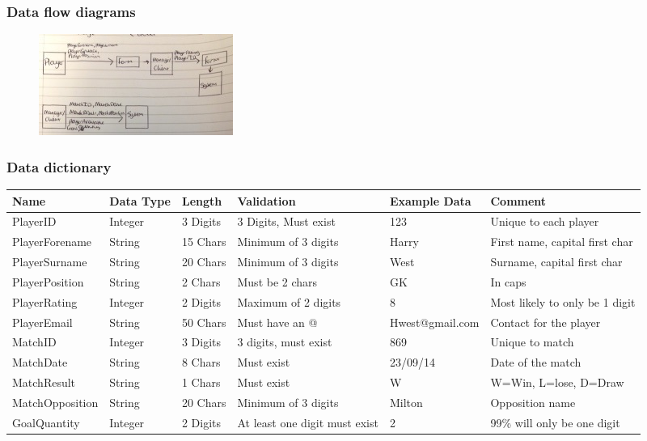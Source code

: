 \subsubsection{Data flow diagrams}
\begin{figure}[H]
	\includegraphics{dataflow}
\end{figure}

\subsubsection{Data dictionary}

\begin{table}[H]
\centering
\label{my-label}
\begin{tabular}{|p{2.5cm}|p{1cm}|p{1.5cm}|p{2.5cm}|p{2.5cm}|p{2.5cm}|} 
\hline
Name            & Data Type & Length   & Validation                    & Example Data    & Comment                        \\ \hline
PlayerID        & Integer   & 3 Digits & 3 Digits, Must exist          & 123             & Unique to each player          \\ \hline
PlayerForename  & String    & 15 Chars & Minimum of 3 digits           & Harry           & First name, capital first char \\ \hline
PlayerSurname   & String    & 20 Chars & Minimum of 3 digits           & West            & Surname, capital first char    \\ \hline
PlayerPosition  & String    & 2 Chars  & Must be 2 chars               & GK              & In caps                        \\ \hline
PlayerRating    & Integer   & 2 Digits & Maximum of 2 digits           & 8               & Most likely to only be 1 digit \\ \hline
PlayerEmail     & String    & 50 Chars & Must have an @                & Hwest@gmail.com & Contact for the player         \\ \hline
MatchID         & Integer   & 3 Digits & 3 digits, must exist          & 869             & Unique to match                \\ \hline
MatchDate       & String    & 8 Chars  & Must exist                    & 23/09/14        & Date of the match              \\ \hline
MatchResult     & String    & 1 Chars  & Must exist                    & W               & W=Win, L=lose, D=Draw          \\ \hline
MatchOpposition & String    & 20 Chars & Minimum of 3 digits           & Milton          & Opposition name                \\ \hline
GoalQuantity    & Integer   & 2 Digits & At least one digit must exist & 2               & 99\% will only be one digit    \\ \hline
\end{tabular}
\end{table}

